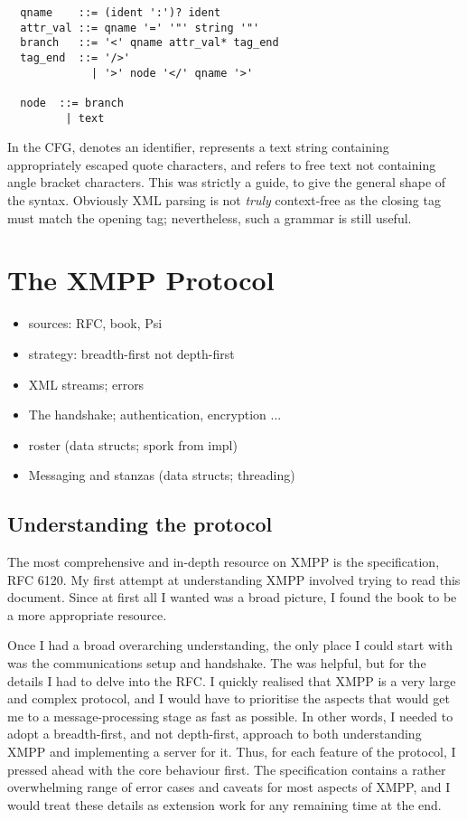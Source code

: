 \begin{minipage}{\linewidth}
  \begin{lstlisting}
  qname    ::= (ident ':')? ident
  attr_val ::= qname '=' '"' string '"'
  branch   ::= '<' qname attr_val* tag_end
  tag_end  ::= '/>'
             | '>' node '</' qname '>'

  node  ::= branch
         | text

  \end{lstlisting}
\end{minipage}

In the CFG,  denotes an identifier,  represents a text string containing appropriately escaped quote characters, and  refers to free text not containing angle bracket characters. This was strictly a guide, to give the general shape of the syntax. Obviously XML parsing is not \emph{truly} context-free as the closing tag must match the opening tag; nevertheless, such a grammar is still useful.

\section{The XMPP Protocol}
\begin{itemize}
  \item sources: RFC, book, Psi
  \item strategy: breadth-first not depth-first
  \item XML streams; errors
  \item The handshake; authentication, encryption ...
  \item roster (data structs; spork from impl)
  \item Messaging and stanzas (data structs; threading)
\end{itemize}
\subsection{Understanding the protocol}
The most comprehensive and in-depth resource on XMPP is the specification, RFC 6120. My first attempt at understanding XMPP involved trying to read this document. Since at first all I wanted was a broad picture, I found the book  to be a more appropriate resource.

Once I had a broad overarching understanding, the only place I could start with was the communications setup and handshake. The  was helpful, but for the details I had to delve into the RFC. I quickly realised that XMPP is a very large and complex protocol, and I would have to prioritise the aspects that would get me to a message-processing stage as fast as possible. In other words, I needed to adopt a breadth-first, and not depth-first, approach to both understanding XMPP and implementing a server for it. Thus, for each feature of the protocol, I pressed ahead with the core behaviour first. The specification contains a rather overwhelming range of error cases and caveats for most aspects of XMPP, and I would treat these details as extension work for any remaining time at the end.

